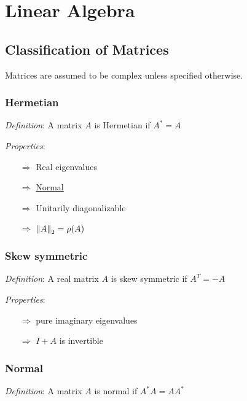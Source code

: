 \documentclass[12pt]{article}
\begin{document}
\maketitle

\pagebreak
\tableofcontents

\pagebreak
\section{Linear Algebra}

\subsection{Classification of Matrices}
Matrices are assumed to be complex unless specified otherwise.

\subsubsection{Hermetian}
\textit{Definition}: A matrix \( A \) is Hermetian if \( A^* = A \)

\textit{Properties}:
\begin{itemize}[nolistsep]
    \item[\(\Rightarrow\)] Real eigenvalues
    \item[\(\Rightarrow\)] \hyperref[sec:normal]{Normal}
    \item[\(\Rightarrow\)] Unitarily diagonalizable
    \item[\(\Rightarrow\)] \( \left\lVert A\right\rVert_2 = \rho(A) \)
\end{itemize}


\subsubsection{Skew symmetric}
\textit{Definition}: A real matrix \( A \) is skew symmetric if \( A^T = -A \)

\textit{Properties}:
\begin{itemize}[nolistsep]
    \item[\(\Rightarrow\)] pure imaginary eigenvalues
    \item[\(\Rightarrow\)] \( I+A \) is invertible
\end{itemize}


\subsubsection{Normal}
\label{sec:normal}
\textit{Definition}: A matrix \( A \) is normal if \( A^*A = AA^* \)
\end{document}
